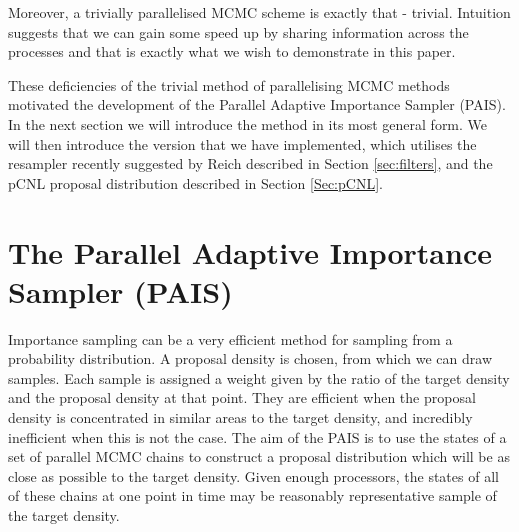 \documentclass[final]{siamltex}
\begin{document}
Moreover, a trivially parallelised MCMC scheme is exactly that -
trivial. Intuition suggests that we can gain some speed up by sharing information across the processes and that is
exactly what we wish to demonstrate in this paper.

These deficiencies of the trivial method of parallelising MCMC methods
motivated the development of the Parallel Adaptive Importance Sampler
(PAIS). In the next section we will introduce the method in its most
general form. We will then introduce the version that we have
implemented, which utilises the resampler recently suggested by
Reich\cite{reich2013nonparametric} described in Section
\ref{sec:filters}, and the pCNL proposal distribution described in
Section \ref{Sec:pCNL}.


\section{The Parallel Adaptive Importance Sampler \allowbreak (PAIS)}\label{Sec:PAIS}



Importance sampling can be a very efficient method for sampling from a
probability distribution. A proposal density is chosen, from which we
can draw samples. Each sample is assigned a weight given by the
ratio of the target density and the proposal density at that
point. They are efficient when the proposal density is concentrated in
similar areas to the target density, and incredibly inefficient when
this is not the case. The aim of the PAIS is to use the states of a
set of parallel MCMC chains to construct a proposal distribution which
will be as close as possible to the target density. Given enough
processors, the states of all of these chains at one point
in time may be reasonably representative sample of the target density.
\end{document}
